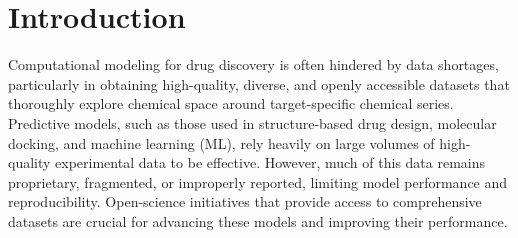 \documentclass[journal=jcim,manuscript=article]{achemso}
\begin{document}
\section{Introduction}
Computational modeling for drug discovery is often hindered by data shortages, particularly in obtaining high-quality, diverse, and openly accessible datasets that thoroughly explore chemical space around target-specific chemical series\cite{van_tilborg_deep_2024, volkamer_machine_2023}. Predictive models, such as those used in structure-based drug design, molecular docking, and machine learning (ML), rely heavily on large volumes of high-quality experimental data to be effective. However, much of this data remains proprietary, fragmented, or improperly reported, limiting model performance and reproducibility.\cite{baker_1500_2016, ash_practically_2024, kapoor_leakage_2023, wognum_call_2024, volkamer_machine_2023} Open-science initiatives that provide access to comprehensive datasets are crucial for advancing these models and improving their performance.
\end{document}
